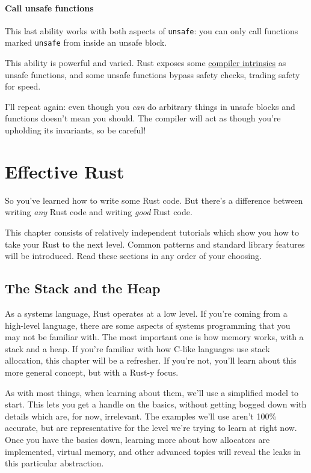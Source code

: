 \documentclass[a4paper,]{book}
\begin{document}
\subsubsection{Call unsafe functions}\label{call-unsafe-functions}

This last ability works with both aspects of \texttt{unsafe}: you can
only call functions marked \texttt{unsafe} from inside an unsafe block.

This ability is powerful and varied. Rust exposes some
\protect\hyperlink{sec--intrinsics}{compiler intrinsics} as unsafe
functions, and some unsafe functions bypass safety checks, trading
safety for speed.

I'll repeat again: even though you \emph{can} do arbitrary things in
unsafe blocks and functions doesn't mean you should. The compiler will
act as though you're upholding its invariants, so be careful!

\hypertarget{sec--effective-rust}{\chapter{Effective
Rust}\label{sec--effective-rust}}

So you've learned how to write some Rust code. But there's a difference
between writing \emph{any} Rust code and writing \emph{good} Rust code.

This chapter consists of relatively independent tutorials which show you
how to take your Rust to the next level. Common patterns and standard
library features will be introduced. Read these sections in any order of
your choosing.

\hypertarget{sec--the-stack-and-the-heap}{\section{The Stack and the
Heap}\label{sec--the-stack-and-the-heap}}

As a systems language, Rust operates at a low level. If you're coming
from a high-level language, there are some aspects of systems
programming that you may not be familiar with. The most important one is
how memory works, with a stack and a heap. If you're familiar with how
C-like languages use stack allocation, this chapter will be a refresher.
If you're not, you'll learn about this more general concept, but with a
Rust-y focus.

As with most things, when learning about them, we'll use a simplified
model to start. This lets you get a handle on the basics, without
getting bogged down with details which are, for now, irrelevant. The
examples we'll use aren't 100\% accurate, but are representative for the
level we're trying to learn at right now. Once you have the basics down,
learning more about how allocators are implemented, virtual memory, and
other advanced topics will reveal the leaks in this particular
abstraction.
\end{document}
